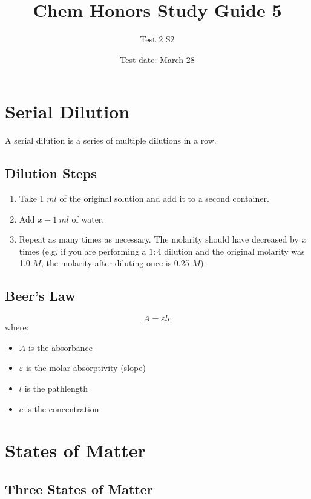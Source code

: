 \documentclass[a4paper, 12pt]{article}
\title{Chem Honors Study Guide 5}
\author{Test 2 S2}
\date{Test date: March 28}
\begin{document}
\maketitle

\section{Serial Dilution}
A serial dilution is a series of multiple dilutions in a row.

\subsection*{Dilution Steps}

\begin{enumerate}[leftmargin=*]
    \item Take 1 $ml$ of the original solution and add it to a second container.
    \item Add $x-1 \: ml$ of water.
    \item Repeat as many times as necessary. The molarity should have decreased by $x$ times (e.g. if you are performing a $1:4$ dilution and the original molarity was 1.0 $M$, the molarity after diluting once is 0.25 $M$).
\end{enumerate}

\subsection*{Beer's Law}

\begin{equation}\label{beers}
A = \varepsilon l c
\end{equation}
where:
\begin{itemize}[leftmargin=*, nosep]
    \item $A$ is the absorbance
    \item $\varepsilon$ is the molar absorptivity (slope)
    \item $l$ is the pathlength
    \item $c$ is the concentration
\end{itemize}

\section{States of Matter}

\subsection*{Three States of Matter}
\end{document}
